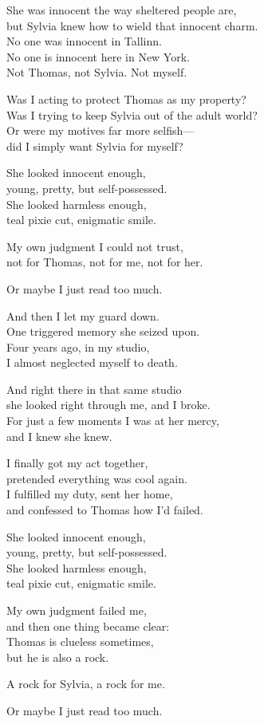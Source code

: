 \begin{lyrics}
She was innocent the way sheltered people are,\\
but Sylvia knew how to wield that innocent charm.\\
No one was innocent in Tallinn.\\
No one is innocent here in New York.\\
Not Thomas, not Sylvia. Not myself.

Was I acting to protect Thomas as my property?\\
Was I trying to keep Sylvia out of the adult world?\\
Or were my motives far more selfish—\\
did I simply want Sylvia for myself?

She looked innocent enough,\\
young, pretty, but self-possessed.\\
She looked harmless enough,\\
teal pixie cut, enigmatic smile.

My own judgment I could not trust,\\
not for Thomas, not for me, not for her.

Or maybe I just read too much.

And then I let my guard down.\\
One triggered memory she seized upon.\\
Four years ago, in my studio,\\
I almost neglected myself to death.

And right there in that same studio\\
she looked right through me, and I broke.\\
For just a few moments I was at her mercy,\\
and I knew she knew.

I finally got my act together,\\
pretended everything was cool again.\\
I fulfilled my duty, sent her home,\\
and confessed to Thomas how I'd failed.

She looked innocent enough,\\
young, pretty, but self-possessed.\\
She looked harmless enough,\\
teal pixie cut, enigmatic smile.

My own judgment failed me,\\
and then one thing became clear:\\
Thomas is clueless sometimes,\\
but he is also a rock.

A rock for Sylvia, a rock for me.

Or maybe I just read too much.
\end{lyrics}

